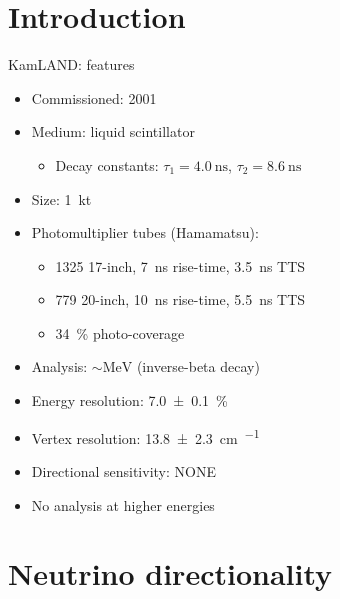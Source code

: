 \documentclass[14pt]{beamer}
\begin{document}
\section{Introduction}
\begin{frame}[t]{KamLAND: features}
	\begin{itemize}
		\item<1-> Commissioned: \num{2001}
		\item<1-> Medium: liquid scintillator
			\begin{itemize}
				\item<1-> Decay constants: $\tau_1 = \SI{4.0}{\nano\second}$, $\tau_2 = \SI{8.6}{\nano\second}$
			\end{itemize}
		\item<1-> Size: \SI{1}{\kilo\tonne}
		\item<1-> Photomultiplier tubes (Hamamatsu):\\
			\begin{itemize}
				\item \num{1325} 17-inch, \SI{7}{\nano\second} rise-time,
					\SI{3.5}{\nano\second} TTS
				\item \num{779} 20-inch, \SI{10}{\nano\second} rise-time,
					\SI{5.5}{\nano\second} TTS
				\item \SI{34}{\percent} photo-coverage
			\end{itemize}
		\item<1-> Analysis: $\sim\si{\mega\electronvolt}$ \APnue
			(inverse-beta decay)
		\item<1-> Energy resolution: \SI{7.0\pm0.1}{\percent}
		\item<1-> Vertex resolution:
			\SI{13.8\pm2.3}{\centi\meter\per{}}
		\item<2-> {\color{red}Directional sensitivity: NONE}
		\item<3-> {\color{red}No analysis at higher energies}
	\end{itemize}
\end{frame}

\section{Neutrino directionality}
\end{document}
